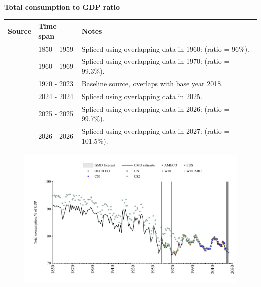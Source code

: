 \documentclass[12pt,a4paper,landscape]{article}
\begin{document}
\begin{adjustbox}{max totalsize={\paperwidth}{\paperheight},center}
\begin{minipage}[t][\textheight][t]{\textwidth}
\vspace*{0.5cm}
{}
\begin{center}
{\Large\bfseries Total consumption to GDP ratio}
\end{center}
\vspace{0.5cm}
\begin{table}[H]
\centering
\small
\begin{tabular}{|l|l|l|}
\hline
\textbf{Source} & \textbf{Time span} & \textbf{Notes} \\
\hline
\rowcolor{white}\cite{CS2_ESP}& 1850 - 1959 &Spliced using overlapping data in 1960: (ratio = 96\%). \\
\rowcolor{lightgray}\cite{OECD_EO}& 1960 - 1969 &Spliced using overlapping data in 1970: (ratio = 99.3\%). \\
\rowcolor{white}\cite{WDI}& 1970 - 2023 &Baseline source, overlaps with base year 2018. \\
\rowcolor{lightgray}\cite{EUS}& 2024 - 2024 &Spliced using overlapping data in 2025. \\
\rowcolor{white}\cite{OECD_EO}& 2025 - 2025 &Spliced using overlapping data in 2026: (ratio = 99.7\%). \\
\rowcolor{lightgray}\cite{AMECO}& 2026 - 2026 &Spliced using overlapping data in 2027: (ratio = 101.5\%). \\
\hline
\end{tabular}
\end{table}
\begin{figure}[H]
\centering
\includegraphics[width=\textwidth,height=0.6\textheight,keepaspectratio]{graphs/ESP_cons_GDP.pdf}
\end{figure}
\end{minipage}
\end{adjustbox}
\end{document}
